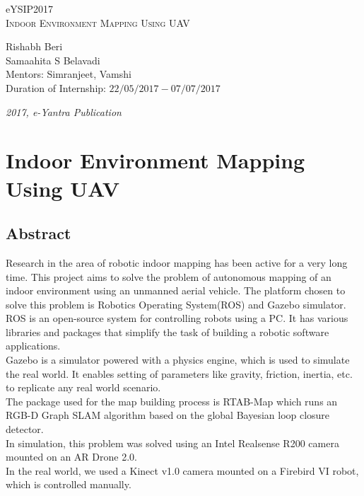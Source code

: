 \documentclass[a4paper,12pt,oneside]{book}
\begin{document}
\begin{titlepage}
\raggedright
{\Large eYSIP2017\\[1cm]}
{\Huge\scshape Indoor Environment Mapping Using UAV \\[.1in]}
\vfill
\begin{flushright}
{\large Rishabh Beri \\}
{\large Samaahita S Belavadi \\}
{\large Mentors: Simranjeet, Vamshi \\}
{\large Duration of Internship: $ 22/05/2017-07/07/2017 $ \\}
\end{flushright}

{\itshape 2017, e-Yantra Publication}
\end{titlepage}

\chapter[Project Tag]{Indoor Environment Mapping Using UAV}
\section*{Abstract}
Research in the area of robotic indoor mapping has been active for a very long time. This project aims to solve the problem of autonomous mapping of an indoor environment using an unmanned aerial vehicle. The platform chosen to solve this problem is Robotics Operating System(ROS) and Gazebo simulator. \\
ROS is an open-source system for controlling robots using a PC. It has various libraries and packages that simplify the task of building a robotic software applications. \\
Gazebo is a simulator powered with a physics engine, which is used to simulate the real world. It enables setting of parameters like gravity, friction, inertia, etc. to replicate any real world scenario. \\
The package used for the map building process is RTAB-Map which runs an RGB-D Graph SLAM algorithm based on the global Bayesian loop closure detector. \\
In simulation, this problem was solved using an Intel Realsense R200 camera mounted on an AR Drone 2.0. \\
In the real world, we used a Kinect v1.0 camera mounted on a Firebird VI robot, which is controlled manually.
\end{document}

